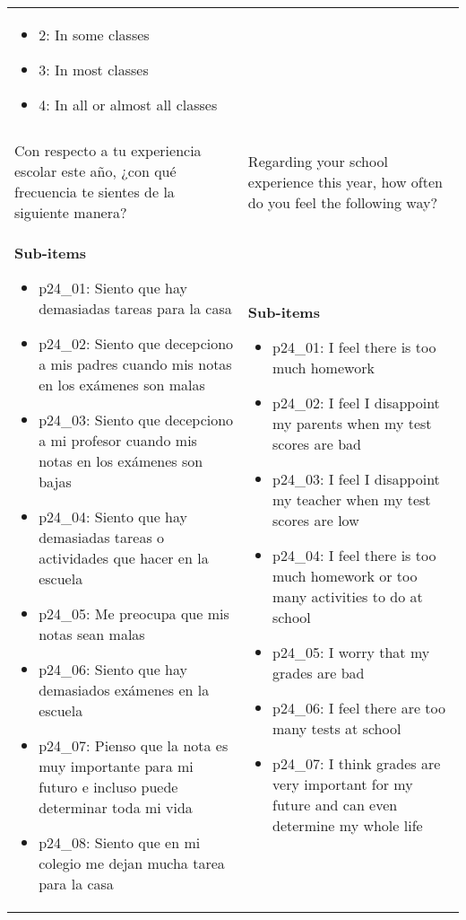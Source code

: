 \documentclass[11pt]{article}
\begin{document}
\begin{longtable}{@{}LL@{}}
\begin{itemize}[leftmargin=*]
\item 2: In some classes
\item 3: In most classes
\item 4: In all or almost all classes\end{itemize} \\
\addlinespace[4pt]
 \\ 
Con respecto a tu experiencia escolar este año, ¿con qué frecuencia te sientes de la siguiente manera? & Regarding your school experience this year, how often do you feel the following way? \\
\textbf{Sub-items}\par\begin{itemize}[leftmargin=*]\item p24\_01: Siento que hay demasiadas tareas para la casa
\item p24\_02: Siento que decepciono a mis padres cuando mis notas en los exámenes son malas
\item p24\_03: Siento que decepciono a mi profesor cuando mis notas en los exámenes son bajas
\item p24\_04: Siento que hay demasiadas tareas o actividades que hacer en la escuela
\item p24\_05: Me preocupa que mis notas sean malas
\item p24\_06: Siento que hay demasiados exámenes en la escuela
\item p24\_07: Pienso que la nota es muy importante para mi futuro e incluso puede determinar toda mi vida
\item p24\_08: Siento que en mi colegio me dejan mucha tarea para la casa\end{itemize} & \textbf{Sub-items}\par\begin{itemize}[leftmargin=*]\item p24\_01: I feel there is too much homework
\item p24\_02: I feel I disappoint my parents when my test scores are bad
\item p24\_03: I feel I disappoint my teacher when my test scores are low
\item p24\_04: I feel there is too much homework or too many activities to do at school
\item p24\_05: I worry that my grades are bad
\item p24\_06: I feel there are too many tests at school
\item p24\_07: I think grades are very important for my future and can even determine my whole life

\end{itemize}
\end{longtable}
\end{document}
